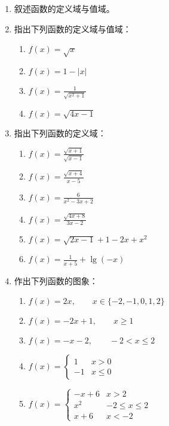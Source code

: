 \begin{enumerate}
    \item 叙述函数的定义域与值域。
    \item 指出下列函数的定义域与值域：
\begin{multicols}{2}
\begin{enumerate}
    \item $f(x)=\sqrt{x}$
    \item $f(x)=1-|x|$
    \item $f(x)=\frac{1}{\sqrt{x^2+1}}$
    \item $f(x)=\sqrt{4x-1}$
\end{enumerate}
\end{multicols}
    
    \item 指出下列函数的定义域：
\begin{multicols}{2}
\begin{enumerate}
\item $f(x)=\frac{\sqrt{x+1}}{\sqrt{x-1}}$
\item $f(x)=\frac{\sqrt{x+4}}{x-5}$
\item $f(x)=\frac{6}{x^2-3x+2}$
\item $f(x)=\frac{\sqrt{4x+8}}{3x-2}$
\item $f(x)=\sqrt{2x-1}+1-2x+x^2$
\item $f(x)=\frac{1}{x+5}+\lg(-x)$
\end{enumerate}
\end{multicols}
    \item 作出下列函数的图象：
\begin{enumerate}
    \item $f(x)=2x,\qquad x\in\{-2,-1,0,1,2\}$
    \item $f(x)=-2x+1,\qquad x\ge 1$
    \item $f(x)=-x-2,\qquad -2<x\le 2$
    \item $f(x)=\begin{cases}
        1&x>0\\-1&x\le 0
    \end{cases}$
    \item $f(x)=\begin{cases}
        -x+6  &  x>2\\
        x^2& -2\le x\le 2\\
        x+6& x<-2
    \end{cases}$
\end{enumerate}


\end{enumerate}
